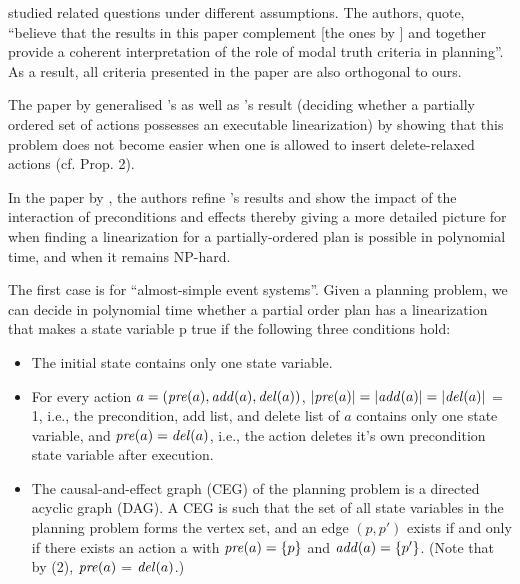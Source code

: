 \cite{KambhampatiModalTruth1996} studied related questions under different assumptions. The authors, quote, “believe that the  results  in  this  paper  complement  [the  ones  by \cite{NEBEL1994125}]  and  together  provide  a  coherent  interpretation of the role of modal truth criteria in planning”. As a result, all criteria presented in the paper are also orthogonal to ours.

The paper by \cite{DeleteRelaxation} generalised \cite{NEBEL1994125}'s as well as \cite{ErolHTNExpressivity}'s result (deciding whether a partially ordered
set of actions possesses an executable linearization) by showing that this problem does not become easier when one is allowed to insert delete-relaxed  actions  (cf.  Prop.  2). 


In the paper by \cite{TanGruningerPOPlanComplexity}, the authors refine \cite{NEBEL1994125}'s results and show the impact of the interaction of preconditions and effects thereby giving a more detailed picture for when finding a linearization for a partially-ordered plan is possible in polynomial time, and when it remains NP-hard.

The first case is for \enquote{almost-simple event systems}. Given a planning problem, we can decide in polynomial time whether a partial order plan has a linearization that makes a state variable p true if the following three conditions hold:
\begin{itemize}
	\item The initial state contains only one state variable.
	\item For every action $a = (\mathit{pre}(a), \mathit{add}(a), \mathit{del}(a))$, $|\mathit{pre}(a)| = |\mathit{add}(a)| = |\mathit{del}(a)|$ = 1, i.e., the precondition, add list, and delete list of $a$ contains only one state variable, and $\mathit{pre}(a) = \mathit{del}(a)$, i.e., the action deletes it's own precondition state variable after execution.
	\item The causal-and-effect graph (CEG) of the planning problem is a directed acyclic graph (DAG). A CEG is such that the set of all state variables in the planning problem forms the vertex set, and an edge $(p, p')$ exists if and only if there exists an action a with $\mathit{pre}(a) = \{p\}$ and $\mathit{add}(a) = \{p'\}$. (Note that by (2), $\mathit{pre}(a)$ = $\mathit{del}(a)$.)
\end{itemize}

